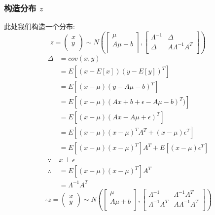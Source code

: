 \documentclass{report}
\begin{document}
\subsubsection{构造分布 $z$}
此处我们构造一个分布:
$$
z = 
\left (
\begin{matrix}
x\\
y\\
\end{matrix}
\right )
\sim N(
\left [
\begin{matrix}
\mu\\
A\mu+b\\
\end{matrix}
\right ],
\left [
\begin{matrix}
\Lambda^{-1}&\Delta\\
\Delta&A\Lambda^{-1} A^T\\
\end{matrix}
\right ]
)
$$
$$
\begin{aligned}
\Delta
&=cov(x,y)\\
&=E[(x-E[x])(y-E[y])^T]\\
&=E[(x-\mu)(y-A\mu - b)^T]\\
&=E[(x-\mu)(Ax+b+ \epsilon -A\mu -b)^T)]\\
&=E[(x-\mu)(Ax-A\mu + \epsilon)^T]\\
&=E[(x-\mu)(x-\mu)^T A^T + (x-\mu)\epsilon^T]\\
&=E[(x-\mu)(x-\mu)^T]A^T + E[(x-\mu)\epsilon^T] \\
\because &x \perp \epsilon\\
\therefore &=E[(x-\mu)(x-\mu)^T]A^T\\
&=\Lambda^{-1}A^T
\end{aligned}
$$
$$
\therefore z=
\left ( \begin{matrix}
x\\y
\end{matrix} \right )
\sim N(
\left [
\begin{matrix}
\mu\\
A\mu+b\\
\end{matrix}
\right ],
\left [
\begin{matrix}
\Lambda^{-1}&\Lambda^{-1}A^T\\
\Lambda^{-1}A^T&A\Lambda^{-1} A^T\\
\end{matrix}
\right ]
)
$$
\end{document}
